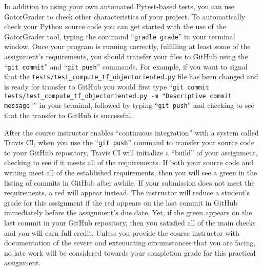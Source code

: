 \documentclass[11pt]{article}
\newcommand{\testprogramsource}{\lstinline{tests/test_compute_tf_objectoriented.py}}
\newcommand{\gatorgraderstart}{\command{gradle grade}}
\newcommand{\gitcommit}{\command{git commit}}
\newcommand{\gitpush}{\command{git push}}
\newcommand{\gitcommittestprogram}{\command{git commit tests/test_compute_tf_objectoriented.py -m "Descriptive commit message"}}
\newcommand{\command}[1]{``\lstinline{#1}''}
\newcommand{\step}[1]{``{#1}''}
\newcommand{\checkmark}{\ding{51}}
\newcommand{\naughtmark}{\ding{55}}
\begin{document}
In addition to using your own automated Pytest-based tests, you can use
GatorGrader to check other characteristics of your project. To automatically
check your Python source code you can get started with the use of the
GatorGrader tool, typing the command \gatorgraderstart{} in your terminal
window.
%
Once your program is running correctly, fulfilling at least some of the
assignment's requirements, you should transfer your files to GitHub using the
\gitcommit{} and \gitpush{} commands. For example, if you want to signal that
the \testprogramsource{} file has been changed and is ready for transfer to
GitHub you would first type \gitcommittestprogram{} in your terminal, followed
by typing \gitpush{} and checking to see that the transfer to GitHub is
successful.

After the course instructor enables \step{continuous integration} with a system
called Travis CI, when you use the \gitpush{} command to transfer your source
code to your GitHub repository, Travis CI will initialize a \step{build} of your
assignment, checking to see if it meets all of the requirements. If both your
source code and writing meet all of the established requirements, then you will
see a green \checkmark{} in the listing of commits in GitHub after awhile. If
your submission does not meet the requirements, a red \naughtmark{} will appear
instead. The instructor will reduce a student's grade for this assignment if the
red \naughtmark{} appears on the last commit in GitHub immediately before the
assignment's due date. Yet, if the green \checkmark{} appears on the last commit
in your GitHub repository, then you satisfied all of the main checks and you
will earn full credit. Unless you provide the course instructor with
documentation of the severe and extenuating circumstances that you are facing,
no late work will be considered towards your completion grade for this practical
assignment.
\end{document}
